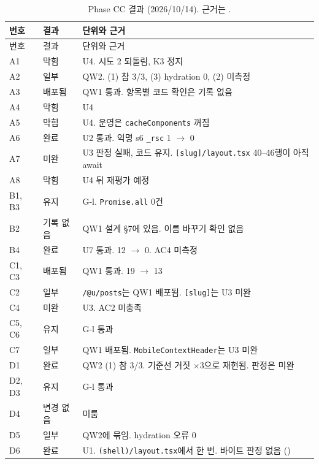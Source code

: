 {\small
\begin{longtable}{@{}L{0.9cm} L{2.0cm} L{9.6cm}@{}}
  \caption{Phase CC 결과 (2026/10/14). 근거는 .}\label{tab:ck-cc}\\
  \toprule
  번호 & 결과 & 단위와 근거 \\
  \midrule
  \endfirsthead
  \toprule
  번호 & 결과 & 단위와 근거 \\
  \midrule
  \endhead
  \bottomrule
  \endfoot
  A1 & 막힘 & U4. 시도 2 되돌림, K3 정지 \\
  \midrule
  A2 & 일부 & QW2. (1) 참 3/3, (3) hydration 0, (2) 미측정 \\
  \midrule
  A3 & 배포됨 & QW1 통과. 항목별 코드 확인은 기록 없음 \\
  \midrule
  A4 & 막힘 & U4 \\
  \midrule
  A5 & 막힘 & U4. 운영은 \texttt{cacheComponents} 꺼짐 \\
  \midrule
  A6 & 완료 & U2 통과. 익명 s6 \texttt{\_rsc} 1 $\to$ 0 \\
  \midrule
  A7 & 미완 & U3 판정 실패, 코드 유지. \texttt{[slug]/layout.tsx} 40--46행이 아직 await \\
  \midrule
  A8 & 막힘 & U4 뒤 재평가 예정 \\
  \midrule
  B1, B3 & 유지 & G-l. \texttt{Promise.all} 0건 \\
  \midrule
  B2 & 기록 없음 & QW1 설계 \S7에 있음. 이름 바꾸기 확인 없음 \\
  \midrule
  B4 & 완료 & U7 통과. 12 $\to$ 0. AC4 미측정 \\
  \midrule
  C1, C3 & 배포됨 & QW1 통과. 19 $\to$ 13 \\
  \midrule
  C2 & 일부 & \texttt{/@u/posts}는 QW1 배포됨. \texttt{[slug]}는 U3 미완 \\
  \midrule
  C4 & 미완 & U3. AC2 미충족 \\
  \midrule
  C5, C6 & 유지 & G-l 통과 \\
  \midrule
  C7 & 일부 & QW1 배포됨. \texttt{MobileContextHeader}는 U3 미완 \\
  \midrule
  D1 & 완료 & QW2 (1) 참 3/3. 기준선 거짓 $\times$3으로 재현됨. 판정은 미완 \\
  \midrule
  D2, D3 & 유지 & G-l 통과 \\
  \midrule
  D4 & 변경 없음 & 미룸 \\
  \midrule
  D5 & 일부 & QW2에 묶임. hydration 오류 0 \\
  \midrule
  D6 & 완료 & U1. \texttt{(shell)/layout.tsx}에서 한 번. 바이트 판정 없음 () \\
\end{longtable}}
